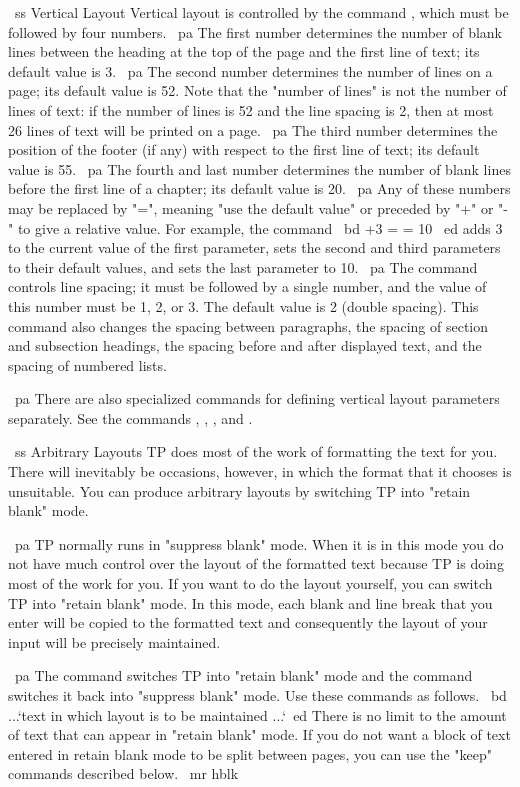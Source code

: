 ~ss Vertical Layout
Vertical layout is controlled by the command \VL, which must be followed
by four numbers.
~pa The first number determines the number of blank lines between the
heading at the top of the page and the first line of text; its default
value is 3.
~pa The second number determines the number of lines on a page; its default
value is 52.
Note that the "number of lines" is not the number of lines of text: if the
number of lines is 52 and the line spacing is 2, then at most 26 lines of text
will be printed on a page.
~pa The third number determines the position of the footer (if any) with 
respect to the first line of text; its default value is 55.
~pa The fourth and last number determines the number of blank lines before the
first line of a chapter; its default value is 20.
~pa Any of these numbers may be replaced by "=", meaning "use the default
value" or preceded by "+" or "-" to give a relative value.
For example, the command
~bd \VL +3 = = 10 ~ed
adds 3 to the current value of the first parameter, sets the second and
third parameters to their default values, and sets the last parameter to 10.
~pa The command \LS controls line spacing; it must be followed by a single
number, and the value of this number must be 1, 2, or 3.
The default value is 2 (double spacing).
This command also changes the spacing between paragraphs,
the spacing of section and subsection headings, the spacing before and
after displayed text, and the spacing of numbered lists.

~pa There are also specialized commands for defining vertical layout
parameters separately.
See the commands \DL, \IL, \PL, and \SL.

~ss Arbitrary Layouts
TP does most of the work of formatting the text for you.
There will inevitably be occasions, however, in which the format that it
chooses is unsuitable.
You can produce arbitrary layouts by switching TP into "retain blank" mode.

~pa TP normally runs in "suppress blank" mode.
When it is in this mode you do not have much control over the layout
of the formatted text because TP is doing most of the work for you.
If you want to do the layout yourself, you can switch TP into
"retain blank" mode.
In this mode, each blank and line break that you enter will be copied
to the formatted text and consequently the layout of your input
will be precisely maintained.

~pa The command \RB switches TP into "retain blank" mode and the
command \SB switches it back into "suppress blank" mode.
Use these commands as follows.
~bd \RB ...`text in which layout is to be maintained ...`\SB ~ed
There is no limit to the amount of text that can appear in
"retain blank" mode.
If you do not want a block of text entered in retain blank mode
to be split between pages, you can use the "keep" commands described below.
~mr hblk

